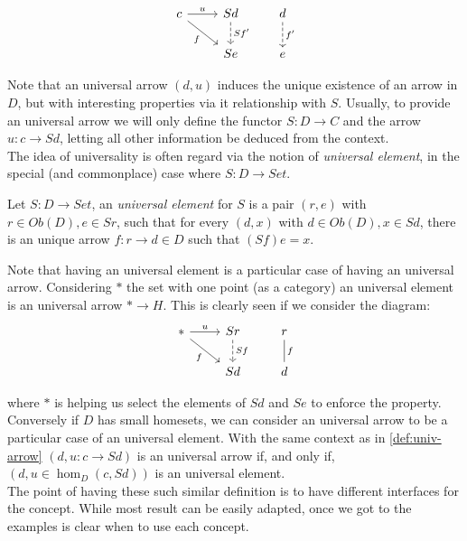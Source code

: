\[
  \begin{tikzcd}
    c\arrow[r, "u"] \arrow[rd, "f", swap]      & Sd \arrow[d, "Sf'", dashed]& d\arrow[d,"f'",dashed]\\
    &Se& e 
  \end{tikzcd}
\]

Note that an universal arrow $(d,u)$ induces the unique existence of an arrow in $D$, but with interesting properties via it relationship with $S$. Usually, to provide an universal arrow we will only define the functor $S:D\to C$ and the arrow $u:c\to Sd$, letting all other information be deduced from the context.\\



The idea of universality is often regard via the notion of \emph{universal element}, in the special (and commonplace) case where $S:D\to Set$.

\begin{definition}
  Let $S: D \to Set$, an \emph{universal element}  for $S$ is a pair $(r,e)$ with $r \in Ob(D), e \in   Sr$, such that for every $(d,x)$ with $d\in Ob(D), x\in Sd$, there is an unique arrow $f:r\to d\in D$ such that $(Sf)e = x$. 
\end{definition}


Note that having an universal element is a particular case of having an universal arrow. Considering $*$ the set with one point (as a category) an universal element is an universal arrow $*\to H$. This is clearly seen if we consider the diagram:
\[
  \begin{tikzcd}
    *\arrow[r, "u"] \arrow[rd, "f", swap] & Sr \arrow[d, "Sf", dashed]& r\arrow[d,"f", dash]\\
    &Sd& d 
  \end{tikzcd}
\]

where $*$ is helping us select the elements of $Sd$ and $Se$ to enforce the property.\\

Conversely if $D$ has small homesets, we can consider an universal arrow to be a particular case of an universal element. With the same context as in \ref{def:univ-arrow} $(d,u: c\to Sd)$ is an universal arrow if, and only if, $(d, u\in  \hom_{D}(c, Sd))$ is an universal element.\\

The point of having these such similar definition is to have different interfaces for the concept. While most result can be easily adapted, once we got to the examples is clear when to use each concept. 

